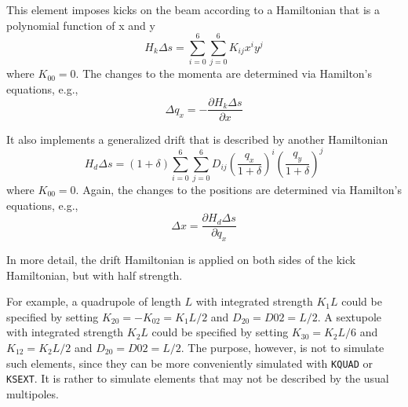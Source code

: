 This element imposes kicks on the beam according
to a Hamiltonian that is a polynomial function of x and y 
\begin{equation}
H_k\Delta s = \sum_{i=0}^{6} \sum_{j=0}^{6} K_{ij} x^i y^j 
\end{equation}
where $K_{00} = 0$.
The changes to the momenta are determined via Hamilton's equations, e.g.,
\begin{equation}
\Delta q_x = -\frac{\partial H_k\Delta s}{\partial x}
\end{equation}

It also implements a generalized drift that is described by another Hamiltonian
\begin{equation}
H_d\Delta s = (1+\delta) \sum_{i=0}^{6} \sum_{j=0}^{6} D_{ij} \left(\frac{q_x}{1+\delta}\right)^i \left(\frac{q_y}{1+\delta}\right)^j
\end{equation}
where $K_{00} = 0$.
Again, the changes to the positions are determined via Hamilton's equations, e.g., 
\begin{equation}
\Delta x = \frac{\partial H_d\Delta s}{\partial q_x}
\end{equation}

In more detail, the drift Hamiltonian is applied on both sides of the kick Hamiltonian, but with
half strength. 

For example, a quadrupole of length $L$ with integrated strength $K_1 L$  could be specified by setting
$K_{20} = -K_{02} = K_1 L/2$ and $D_20 = D02 = L/2$.
A sextupole with integrated strength $K_2 L$ could be specified by setting $K_{30} = K_2 L/6$ and $K_{12} = K_2 L/2$
and $D_20 = D02 = L/2$.
The purpose, however, is not to simulate such elements, since they can be more conveniently simulated with 
\verb|KQUAD| or \verb|KSEXT|.
It is rather to simulate elements that may not be described by the usual multipoles.